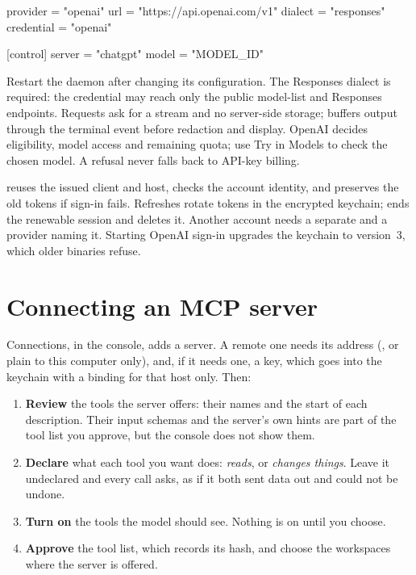 \begin{txt}
provider = "openai"
url = "https://api.openai.com/v1"
dialect = "responses"
credential = "openai"

[control]
server = "chatgpt"
model = "MODEL_ID"
\end{txt}

Restart the daemon after changing its configuration. The Responses dialect
is required: the credential may reach only the public model-list and
Responses endpoints. Requests ask for a stream and no server-side storage;
\nodwyn{} buffers output through the terminal event before redaction and
display. OpenAI decides eligibility, model access and remaining quota; use
Try in Models to check the chosen model. A refusal never falls back to
API-key billing.

 reuses the issued client and host,
checks the account identity, and preserves the old tokens if sign-in fails.
Refreshes rotate tokens in the encrypted keychain;  ends the renewable session and deletes it. Another account needs a
separate  and a provider naming it. Starting OpenAI sign-in
upgrades the keychain to version~3, which older binaries refuse.

\chapter{Connecting an MCP server}

Connections, in the console, adds a server. A remote one needs its address
(, or plain  to this computer only), and, if it needs
one, a key, which goes into the keychain with a binding for that host only.
Then:

\begin{enumerate}[leftmargin=2em]
\item \textbf{Review} the tools the server offers: their names and the
  start of each description. Their input schemas and the server's own
  hints are part of the tool list you approve, but the console does not
  show them.
\item \textbf{Declare} what each tool you want does: \emph{reads}, or
  \emph{changes things}. Leave it undeclared and every call asks, as if it
  both sent data out and could not be undone.
\item \textbf{Turn on} the tools the model should see. Nothing is on until
  you choose.
\item \textbf{Approve} the tool list, which records its hash, and choose the
  workspaces where the server is offered.
\end{enumerate}

